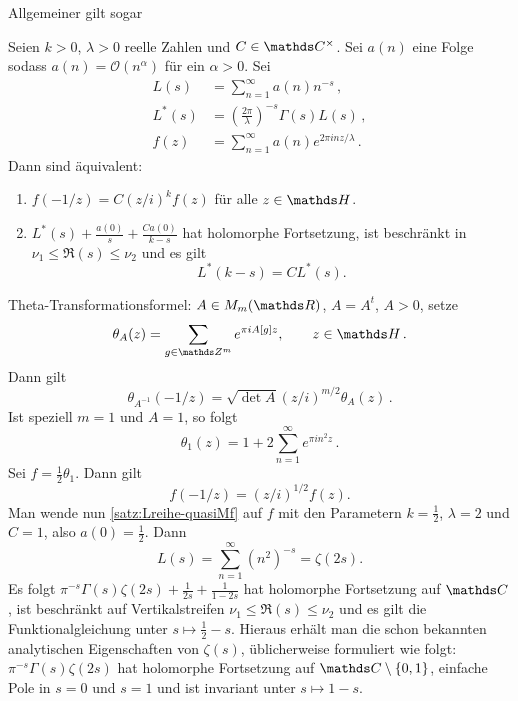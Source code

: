 Allgemeiner gilt sogar

\begin{satz}\label{satz:Lreihe-quasiMf}
	Seien $k > 0$, $\lambda >0$ reelle Zahlen und $C \in \CC^\times$. Sei $a(n)$ eine Folge sodass $a(n) = \mathcal O(n^\alpha)$ für ein $\alpha > 0$. Sei
	\begin{align*}
	L(s) &= \sum_{n=1}^\infty a(n)n^{-s}\,,\\
	L^*(s) &= \left( \frac{2\pi}{\lambda}\right)^{-s} \Gamma(s) L(s)\,,\\
	f(z) &= \sum_{n=1}^\infty a(n)e^{2\pi i nz/\lambda}\,.
	\end{align*}
	Dann sind äquivalent: 
	\begin{enumerate}
		\item $f(-1/z) = C (z/i)^{k} f(z)$ für alle $z \in \HH$.
		\item $L^*(s) + \frac{a(0)}{s} + \frac{Ca(0)}{k - s}$ hat holomorphe Fortsetzung, ist beschränkt in $\nu_1 \leq \Re(s) \leq \nu_2$ und es gilt 
		\[L^*(k - s) = C L^*(s).\]
	\end{enumerate}
\end{satz}


\begin{bsp}
	Theta-Transformationsformel: $A \in M_m(\RR)$, $A = A^t$, $A > 0$, setze
	\[
	\theta_A(z) = \sum_{g \in \ZZ^m} e^{\pi i A[g] z}, \qquad z \in \HH\,.
	\]
	Dann gilt 
	\[
	\theta_{A^{-1}}(-1/z) = \sqrt{\det A} (z / i)^{m/2} \theta_A(z)\,.
	\]
	Ist speziell $m=1$ und $A = 1$, so folgt 
	\[
	\theta_1(z) = 1 + 2\sum_{n=1}^\infty e^{\pi i n^2 z}\,.
	\]
	Sei $f = \frac12 \theta_1$. Dann gilt
	\[
	f(-1/z) = (z/i)^{1/2} f(z).
	\]
	Man wende nun \autoref{satz:Lreihe-quasiMf} auf $f$ mit den Parametern $k = \frac12$, $\lambda = 2$ und $C = 1$, also $a(0) = \frac12$. Dann
	\[
	L(s) = \sum_{n=1}^\infty (n^{2})^{-s} = \zeta(2s).
	\]
	Es folgt $\pi^{-s} \Gamma(s)\zeta(2s) + \frac{1}{2s} + \frac{1}{1-2s}$ hat holomorphe Fortsetzung auf $\CC$, ist beschränkt auf Vertikalstreifen $\nu_1 \leq \Re(s) \leq \nu_2$ und es gilt die Funktionalgleichung unter $s \mapsto \frac12 - s$. Hieraus erhält man die schon bekannten analytischen Eigenschaften von $\zeta(s)$, üblicherweise formuliert wie folgt: $\pi^{-s}\Gamma(s)\zeta(2s)$ hat holomorphe Fortsetzung auf $\CC \setminus \{0,1\}$, einfache Pole in $s= 0$ und $s=1$ und ist invariant  unter $s \mapsto 1 - s$.
\end{bsp} 
